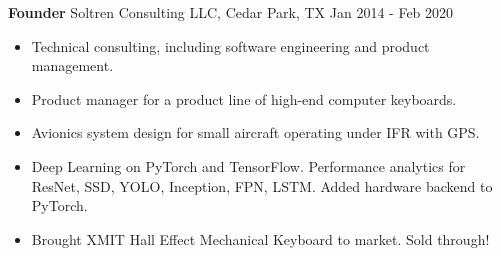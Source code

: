 \textbf{Founder}
Soltren Consulting LLC, Cedar Park, TX \hfill Jan 2014 - Feb 2020

\begin{itemize} \itemsep -2pt

\item Technical consulting, including software engineering and product management.

\item Product manager for a product line of high-end computer keyboards.

\item Avionics system design for small aircraft operating under IFR with GPS.

\item Deep Learning on PyTorch and TensorFlow. Performance analytics for ResNet, SSD, YOLO, Inception, FPN, LSTM. Added hardware backend to PyTorch.

\item Brought XMIT Hall Effect Mechanical Keyboard to market. Sold through!

\end{itemize}
